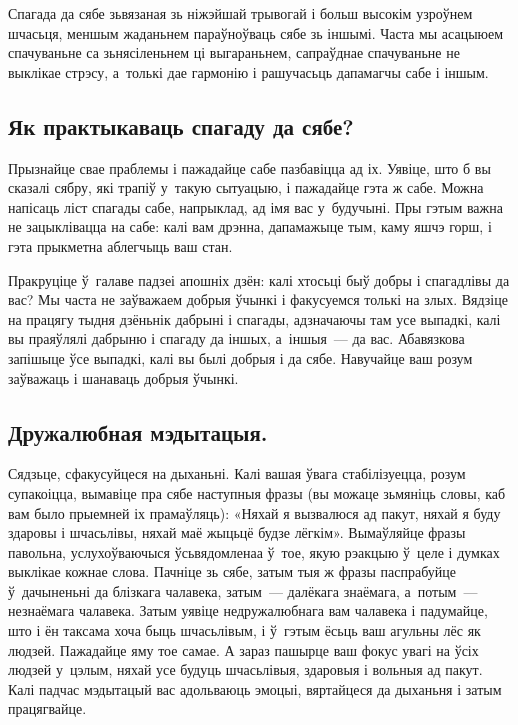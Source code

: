 
Спагада да сябе зьвязаная зь ніжэйшай трывогай і больш высокім узроўнем шчасьця, меншым жаданьнем параўноўваць сябе зь іншымі. Часта мы асацыюем спачуваньне са зьнясіленьнем ці выгараньнем, сапраўднае спачуваньне не выклікае стрэсу, а~толькі дае гармонію і рашучасьць дапамагчы сабе і іншым.

\subsection*{Як практыкаваць спагаду да сябе?}

Прызнайце свае праблемы і пажадайце сабе пазбавіцца ад іх. Уявіце, што б вы сказалі сябру, які трапіў у~такую сытуацыю, і пажадайце гэта ж сабе. Можна напісаць ліст спагады сабе, напрыклад, ад імя вас у~будучыні. Пры гэтым важна не зацыклівацца на сабе: калі вам дрэнна, дапамажыце тым, каму яшчэ горш, і гэта прыкметна аблегчыць ваш стан.

Пракруціце ў~галаве падзеі апошніх дзён: калі хтосьці быў добры і спагадлівы да вас? Мы часта не заўважаем добрыя ўчынкі і факусуемся толькі на злых. Вядзіце на працягу тыдня дзёньнік дабрыні і спагады, адзначаючы там усе выпадкі, калі вы праяўлялі дабрыню і спагаду да іншых, а~іншыя~--- да вас. Абавязкова запішыце ўсе выпадкі, калі вы былі добрыя і да сябе. Навучайце ваш розум заўважаць і шанаваць добрыя ўчынкі.

\subsection*{Дружалюбная мэдытацыя.}

Сядзьце, сфакусуйцеся на дыханьні. Калі вашая ўвага стабілізуецца, розум супакоіцца, вымавіце пра сябе наступныя фразы (вы можаце зьмяніць словы, каб вам было прыемней іх прамаўляць): «Няхай я вызвалюся ад пакут, няхай я буду здаровы і шчасьлівы, няхай маё жыцьцё будзе лёгкім». Вымаўляйце фразы павольна, услухоўваючыся ўсьвядомленаа ў~тое, якую рэакцыю ў~целе і думках выклікае кожнае слова. Пачніце зь сябе, затым тыя ж фразы паспрабуйце ў~дачыненьні да блізкага чалавека, затым~--- далёкага знаёмага, а~потым~--- незнаёмага чалавека. Затым уявіце недружалюбнага вам чалавека і падумайце, што і ён таксама хоча быць шчасьлівым, і ў~гэтым ёсьць ваш агульны лёс як людзей. Пажадайце яму тое самае. А зараз пашырце ваш фокус увагі на ўсіх людзей у~цэлым, няхай усе будуць шчасьлівыя, здаровыя і вольныя ад пакут. Калі падчас мэдытацый вас адольваюць эмоцыі, вяртайцеся да дыханьня і затым працягвайце.

